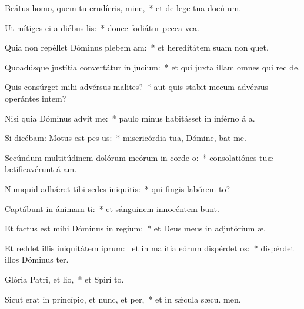 \item Beátus homo, quem tu erudíeris, mine,~* et de lege tua docú um.
\item Ut mítiges ei a diébus lis:~* donec fodiátur pecca vea.
\item Quia non repéllet Dóminus plebem am:~* et hereditátem suam non quet.
\item Quoadúsque justítia convertátur in jucium:~* et qui juxta illam omnes qui rec  de.
\item Quis consúrget mihi advérsus malites?~* aut quis stabit mecum advérsus operántes intem?
\item Nisi quia Dóminus advit me:~* paulo minus habitásset in inférno á a.
\item Si dicébam: Motus est pes us:~* misericórdia tua, Dómine, bat me.
\item Secúndum multitúdinem dolórum meórum in corde o:~* consolatiónes tuæ lætificavérunt á am.
\item Numquid adhǽret tibi sedes iniquitis:~* qui fingis labórem  to?
\item Captábunt in ánimam ti:~* et sánguinem innocéntem bunt.
\item Et factus est mihi Dóminus in regium:~* et Deus meus in adjutórium  æ.
\item Et reddet illis iniquitátem iprum:~\pscross{} et in malítia eórum dispérdet os:~* dispérdet illos Dóminus  ter.
\item Glória Patri, et lio,~* et Spirí to.
\item Sicut erat in princípio, et nunc, et per,~* et in sǽcula sæcu. men.
